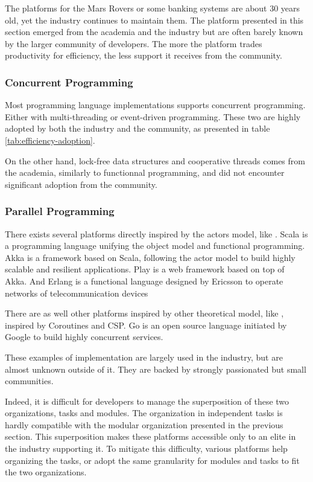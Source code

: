 The platforms for the Mars Rovers or some banking systems are about 30 years old, yet the industry continues to maintain them.
The platform presented in this section emerged from the academia and the industry but are often barely known by the larger community of developers.
The more the platform trades productivity for efficiency, the less support it receives from the community.


\subsubsection{Concurrent Programming}

Most programming language implementations supports concurrent programming.
Either with multi-threading or event-driven programming.
These two are highly adopted by both the industry and the community, as presented in table \ref{tab:efficiency-adoption}.

On the other hand, lock-free data structures and cooperative threads comes from the academia, similarly to functionnal programming, and did not encounter significant adoption from the community.

\subsubsection{Parallel Programming}

There exists several platforms directly inspired by the actors model, like .
Scala is a programming language unifying the object model and functional programming.
Akka is a framework based on Scala, following the actor model to build highly scalable and resilient applications.
Play is a web framework based on top of Akka.
And Erlang is a functional language designed by Ericsson to operate networks of telecommunication devices \cite{Armstrong1993,Nelson2004,Armstrong2014}

There are as well other platforms inspired by other theoretical model, like , inspired by Coroutines and CSP.
Go is an open source language initiated by Google to build highly concurrent services.

These examples of implementation are largely used in the industry, but are almost unknown outside of it.
They are backed by strongly passionated but small communities.

Indeed, it is difficult for developers to manage the superposition of these two organizations, tasks and modules.
The organization in independent tasks is hardly compatible with the modular organization presented in the previous section.
This superposition makes these platforms accessible only to an elite in the industry supporting it.
To mitigate this difficulty, various platforms help organizing the tasks, or adopt the same granularity for modules and tasks to fit the two organizations.


